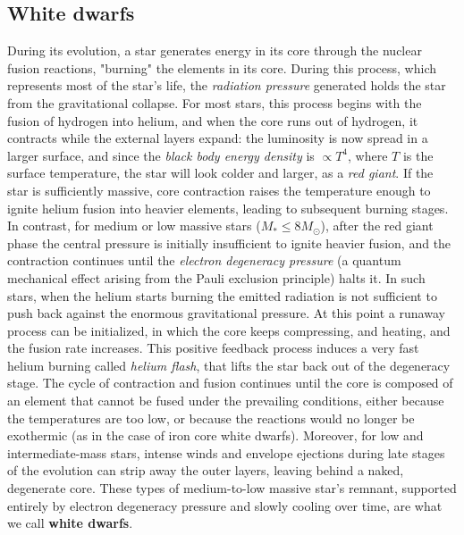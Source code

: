 \subsection{White dwarfs}
During its evolution, a star generates energy in its core through the nuclear fusion reactions, "burning" the elements in its core. 
During this process, which represents most of the star's life, the \textit{radiation pressure} generated holds the star from the gravitational collapse. 
For most stars, this process begins with the fusion of hydrogen into helium, and when the core runs out of hydrogen, it contracts while the external layers expand: the luminosity is now spread in a larger surface, and since the \textit{black body energy density} is $\propto T^4$, where $T$ is the surface temperature, the star will look colder and larger, as a \textit{red giant}.
If the star is sufficiently massive, core contraction raises the temperature enough to ignite helium fusion into heavier elements, leading to subsequent burning stages.  
In contrast, for medium or low massive stars ($M_*\le 8M_\odot$), after the red giant phase the central pressure is initially insufficient to ignite heavier fusion, and the contraction continues until the \textit{electron degeneracy pressure} (a quantum mechanical effect arising from the Pauli exclusion principle) halts it.
In such stars, when the helium starts burning the emitted radiation is not sufficient to push back against the enormous gravitational pressure.
At this point a runaway process can be initialized, in which the core keeps compressing, and heating, and the fusion rate increases.
This positive feedback process induces a very fast helium burning called \textit{helium flash}, that lifts the star back out of the degeneracy stage.
The cycle of contraction and fusion continues until the core is composed of an element that cannot be fused under the prevailing conditions, either because the temperatures are too low, or because the reactions would no longer be exothermic (as in the case of iron core white dwarfs).  
Moreover, for low and intermediate-mass stars, intense winds and envelope ejections during late stages of the evolution can strip away the outer layers, leaving behind a naked, degenerate core.
These types of medium-to-low massive star's remnant, supported entirely by electron degeneracy pressure and slowly cooling over time, are what we call \textbf{white dwarfs}.

